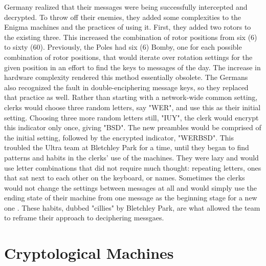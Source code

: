 Germany realized that their messages were being successfully intercepted and decrypted. To throw off their enemies, they added some complexities to the Enigma machines and the practices of using it. First, they added two rotors to the existing three. This increased the combination of rotor positions from six (6) to sixty (60). Previously, the Poles had six (6) Bomby, one for each possible combination of rotor positions, that would iterate over rotation settings for the given position in an effort to find the keys to messages of the day. The increase in hardware complexity rendered this method essentially obsolete. The Germans also recognized the fault in double-enciphering message keys, so they replaced that practice as well. Rather than starting with a network-wide common setting, clerks would choose three random letters, say "WER", and use this as their initial setting. Choosing three more random letters still, "IUY", the clerk would encrypt this indicator only once, giving "BSD". The new preambles would be comprised of the initial setting, followed by the encrypted indicator, "WERBSD". This troubled the Ultra team at Bletchley Park for a time, until they began to find patterns and habits in the clerks' use of the machines. They were lazy and would use letter combinations that did not require much thought: repeating letters, ones that sat next to each other on the keyboard, or names. Sometimes the clerks would not change the settings between messages at all and would simply use the ending state of their machine from one message as the beginning stage for a new one \cite{mf01}. These habits, dubbed "cillies" by Bletchley Park, are what allowed the team to reframe their approach to deciphering messgaes.

\section{Cryptological Machines}

